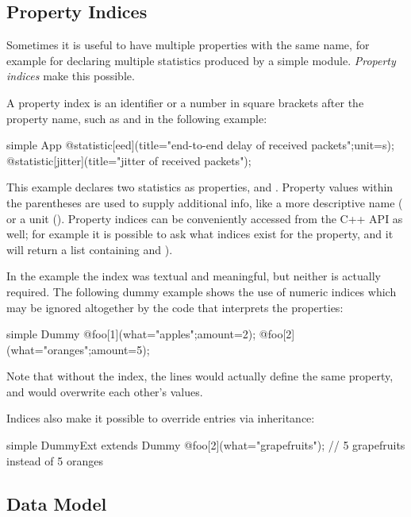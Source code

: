 \subsection{Property Indices}
\label{sec:ned-lang:property-indices}

Sometimes it is useful to have multiple properties with the same name,
for example for declaring multiple statistics produced by a simple module.
\textit{Property indices} make this possible.

A property index is an identifier or a number in square brackets after the
property name, such as  and  in the following example:

\begin{ned}
simple App {
    @statistic[eed](title="end-to-end delay of received packets";unit=s);
    @statistic[jitter](title="jitter of received packets");
}
\end{ned}

This example declares two statistics as  properties,
 and . Property values within
the parentheses are used to supply additional info, like a more
descriptive name ( or a unit ().
Property indices can be conveniently accessed from the C++ API as
well; for example it is possible to ask what indices exist for the
 property, and it will return a list containing
 and ).

In the  example the index was textual and meaningful,
but neither is actually required. The following dummy example
shows the use of numeric indices which may be ignored altogether
by the code that interprets the properties:

\begin{ned}
simple Dummy {
    @foo[1](what="apples";amount=2);
    @foo[2](what="oranges";amount=5);
}
\end{ned}

Note that without the index, the lines would actually define the
same  property, and would overwrite each other's values.

Indices also make it possible to override entries via inheritance:

\begin{ned}
simple DummyExt extends Dummy {
    @foo[2](what="grapefruits"); // 5 grapefruits instead of 5 oranges
}
\end{ned}


\subsection{Data Model}
\label{sec:ned-lang:property-data-model}


